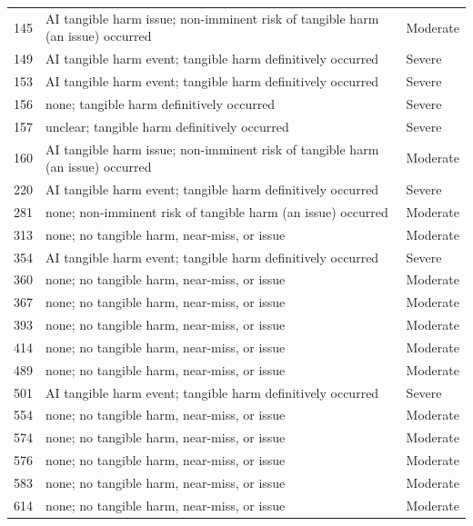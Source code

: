 \documentclass[11pt]{article}
\begin{document}
{\begin{longtable}{@{}r p{9.2cm} l@{}}
145 & AI tangible harm issue; non-imminent risk of tangible harm (an issue) occurred & Moderate \\
149 & AI tangible harm event; tangible harm definitively occurred & Severe \\
153 & AI tangible harm event; tangible harm definitively occurred & Severe \\
156 & none; tangible harm definitively occurred & Severe \\
157 & unclear; tangible harm definitively occurred & Severe \\
160 & AI tangible harm issue; non-imminent risk of tangible harm (an issue) occurred & Moderate \\
220 & AI tangible harm event; tangible harm definitively occurred & Severe \\
281 & none; non-imminent risk of tangible harm (an issue) occurred & Moderate \\
313 & none; no tangible harm, near-miss, or issue & Moderate \\
354 & AI tangible harm event; tangible harm definitively occurred & Severe \\
360 & none; no tangible harm, near-miss, or issue & Moderate \\
367 & none; no tangible harm, near-miss, or issue & Moderate \\
393 & none; no tangible harm, near-miss, or issue & Moderate \\
414 & none; no tangible harm, near-miss, or issue & Moderate \\
489 & none; no tangible harm, near-miss, or issue & Moderate \\
501 & AI tangible harm event; tangible harm definitively occurred & Severe \\
554 & none; no tangible harm, near-miss, or issue & Moderate \\
574 & none; no tangible harm, near-miss, or issue & Moderate \\
576 & none; no tangible harm, near-miss, or issue & Moderate \\
583 & none; no tangible harm, near-miss, or issue & Moderate \\
614 & none; no tangible harm, near-miss, or issue & Moderate \\
\end{longtable}
}
\end{document}
